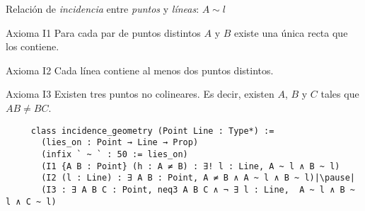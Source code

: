 \begin{frame}[fragile]
	Relación de \textit{incidencia} entre \textit{puntos} y \textit{líneas}: $A\sim l$
	\begin{block}{Axioma I1}
		Para cada par de puntos distintos $A$ y $B$ existe una única recta que los
		contiene.
	\end{block}

	\begin{block}{Axioma I2}
		Cada línea contiene al menos dos puntos distintos.
	\end{block}

	\begin{block}{Axioma I3}
		Existen tres puntos no colineares. Es decir, existen $A$, $B$ y $C$ tales que
		$AB\neq BC$.
	\end{block}

	\begin{lstlisting}
     class incidence_geometry (Point Line : Type*) :=
       (lies_on : Point → Line → Prop)
       (infix ` ~ ` : 50 := lies_on)
       (I1 {A B : Point} (h : A ≠ B) : ∃! l : Line, A ~ l ∧ B ~ l)
       (I2 (l : Line) : ∃ A B : Point, A ≠ B ∧ A ~ l ∧ B ~ l)|\pause|
       (I3 : ∃ A B C : Point, neq3 A B C ∧ ¬ ∃ l : Line,  A ~ l ∧ B ~ l ∧ C ~ l)
    \end{lstlisting}
\end{frame}

